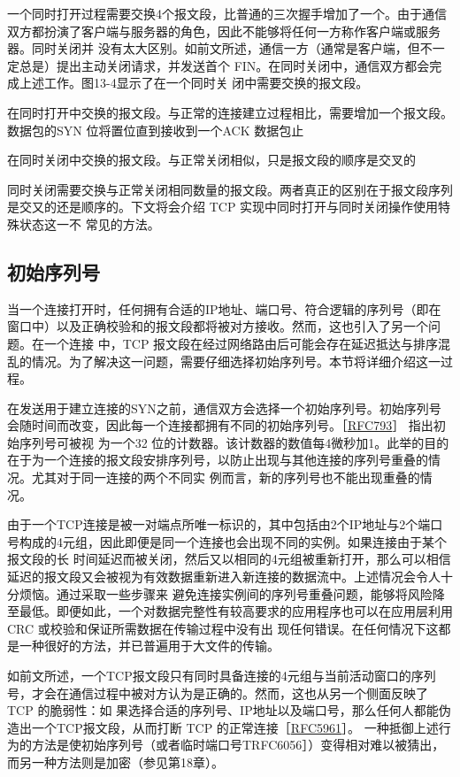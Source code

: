一个同时打开过程需要交换4个报文段，比普通的三次握手增加了一个。由于通信双方都扮演了客户端与服务器的角色，因此不能够将任何一方称作客户端或服务器。同时关闭并
没有太大区别。如前文所述，通信一方（通常是客户端，但不一定总是）提出主动关闭请求，并发送首个 FIN。在同时关闭中，通信双方都会完成上述工作。图13-4显示了在一个同时关
闭中需要交换的报文段。

在同时打开中交换的报文段。与正常的连接建立过程相比，需要增加一个报文段。数据包的SYN 位将置位直到接收到一个ACK 数据包止

在同时关闭中交换的报文段。与正常关闭相似，只是报文段的顺序是交叉的

同时关闭需要交换与正常关闭相同数量的报文段。两者真正的区别在于报文段序列是交又的还是顺序的。下文将会介绍 TCP 实现中同时打开与同时关闭操作使用特殊状态这一不
常见的方法。
\subsection{初始序列号} \label{ssec:initseq}
当一个连接打开时，任何拥有合适的IP地址、端口号、符合逻辑的序列号（即在窗口中）以及正确校验和的报文段都将被对方接收。然而，这也引入了另一个问题。在一个连接
中，TCP 报文段在经过网络路由后可能会存在延迟抵达与排序混乱的情况。为了解决这一问题，需要仔细选择初始序列号。本节将详细介绍这一过程。

在发送用于建立连接的SYN之前，通信双方会选择一个初始序列号。初始序列号会随时间而改变，因此每一个连接都拥有不同的初始序列号。［\href{https://datatracker.ietf.org/doc/html/rfc793#section-3.3}{RFC793}］ 指出初始序列号可被视
为一个32 位的计数器。该计数器的数值每4微秒加1。此举的目的在于为一个连接的报文段安排序列号，以防止出现与其他连接的序列号重叠的情况。尤其对于同一连接的两个不同实
例而言，新的序列号也不能出现重叠的情况。

由于一个TCP连接是被一对端点所唯一标识的，其中包括由2个IP地址与2个端口号构成的4元组，因此即便是同一个连接也会出现不同的实例。如果连接由于某个报文段的长
时间延迟而被关闭，然后又以相同的4元组被重新打开，那么可以相信延迟的报文段又会被视为有效数据重新进入新连接的数据流中。上述情况会令人十分烦恼。通过采取一些步骤来
避免连接实例间的序列号重叠问题，能够将风险降至最低。即便如此，一个对数据完整性有较高要求的应用程序也可以在应用层利用 CRC 或校验和保证所需数据在传输过程中没有出
现任何错误。在任何情况下这都是一种很好的方法，并已普遍用于大文件的传输。

如前文所述，一个TCP报文段只有同时具备连接的4元组与当前活动窗口的序列号，才会在通信过程中被对方认为是正确的。然而，这也从另一个侧面反映了 TCP 的脆弱性：如
果选择合适的序列号、IP地址以及端口号，那么任何人都能伪造出一个TCP报文段，从而打断 TCP 的正常连接［\href{https://datatracker.ietf.org/doc/html/rfc5961#section-5}{RFC5961}］。
一种抵御上述行为的方法是使初始序列号（或者临时端口号TRFC6056］）变得相对难以被猜出，而另一种方法则是加密（参见第18章）。

